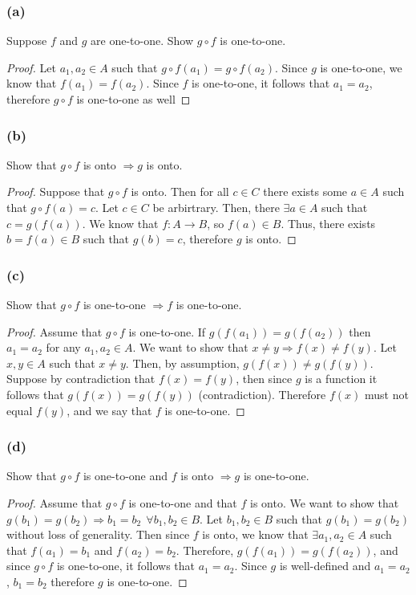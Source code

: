 \documentclass{article}
\begin{document}
\subsubsection*{(a)}
Suppose $f$ and $g$ are one-to-one.
Show $g \circ f$ is one-to-one.
\begin{proof}
    Let $a_1, a_2 \in A$ such that $g \circ f (a_1) = g \circ f (a_2)$.
    Since $g$ is one-to-one, we know that $f(a_1) = f(a_2)$.
    Since $f$ is one-to-one, it follows that $a_1 = a_2$, therefore $g \circ f$ is one-to-one as well
\end{proof}

\subsubsection*{(b)}
Show that $g \circ f$ is onto $\Longrightarrow g$ is onto.
\begin{proof}
    Suppose that $g \circ f$ is onto.
    Then for all $c \in C$ there exists some $a \in A$ such that $g \circ f (a) = c$.
    Let $c \in C$ be arbirtrary.
    Then, there $\exists a \in A$ such that $c=g(f(a))$.
    We know that $f : A \rightarrow B$, so $f(a) \in B$.
    Thus, there exists $b = f(a) \in B$ such that $g(b) = c$, therefore $g$ is onto.
\end{proof}
\subsubsection*{(c)}
Show that $g \circ f$ is one-to-one $\Longrightarrow f$ is one-to-one.
\begin{proof}
    Assume that $g \circ f$ is one-to-one.
    If $g(f(a_1)) = g(f(a_2))$ then $a_1 = a_2$ for any $a_1, a_2 \in A$.
    We want to show that $x \neq y \Longrightarrow f(x) \neq f(y)$.
    Let $x,y \in A$ such that $x \neq y$.
    Then, by assumption, $g(f(x)) \neq g(f(y))$.
    Suppose by contradiction that $f(x) = f(y)$, then since $g$ is a function it follows that $g(f(x)) = g(f(y))$ (contradiction).
    Therefore $f(x)$ must not equal $f(y)$, and we say that $f$ is one-to-one.
\end{proof}
\subsubsection*{(d)}
Show that $g \circ f$ is one-to-one and $f$ is onto $\Longrightarrow g$ is one-to-one.
\begin{proof}
    Assume that $g \circ f$ is one-to-one and that $f$ is onto.
    We want to show that $g(b_1) = g(b_2) \Longrightarrow b_1 = b_2 \ \ \forall b_1, b_2 \in B$.
    Let $b_1, b_2 \in B$ such that $g(b_1) = g(b_2)$ without loss of generality.
    Then since $f$ is onto, we know that $\exists a_1, a_2 \in A$ such that $f(a_1) = b_1$ and $f(a_2) = b_2$.
    Therefore, $g(f(a_1)) = g(f(a_2))$, and since $g \circ f$ is one-to-one, it follows that $a_1 = a_2$.
    Since $g$ is well-defined and $a_1 = a_2$, $b_1 = b_2$ therefore $g$ is one-to-one.
\end{proof}
\end{document}
